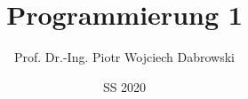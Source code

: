 \usepackage[utf8]{inputenc}
\usepackage[T1]{fontenc}
\usepackage[export]{adjustbox}
\usepackage{amssymb}
\usepackage{listings}


\title{Programmierung 1}
\date{SS 2020}
\author[PWD]{Prof. Dr.-Ing. Piotr Wojciech Dabrowski}

\usepackage{HTWBeamerTemplate/beamerthemeHTW}
